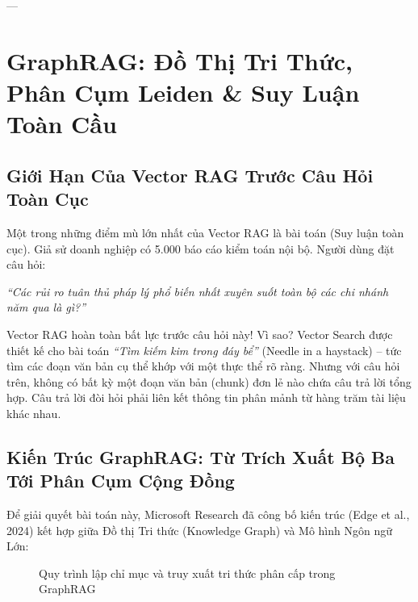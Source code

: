 ---

\section{GraphRAG: Đồ Thị Tri Thức, Phân Cụm Leiden \& Suy Luận Toàn Cầu}
\label{sec:graph-rag}

\subsection{Giới Hạn Của Vector RAG Trước Câu Hỏi Toàn Cục}
Một trong những điểm mù lớn nhất của Vector RAG là bài toán  (Suy luận toàn cục).
Giả sử doanh nghiệp có 5.000 báo cáo kiểm toán nội bộ. Người dùng đặt câu hỏi:
\begin{center}
\textit{``Các rủi ro tuân thủ pháp lý phổ biến nhất xuyên suốt toàn bộ các chi nhánh năm qua là gì?''}
\end{center}
Vector RAG hoàn toàn bất lực trước câu hỏi này! Vì sao?
Vector Search được thiết kế cho bài toán \textit{``Tìm kiếm kim trong đáy bể''} (Needle in a haystack) -- tức tìm các đoạn văn bản cụ thể khớp với một thực thể rõ ràng. Nhưng với câu hỏi trên, không có bất kỳ một đoạn văn bản (chunk) đơn lẻ nào chứa câu trả lời tổng hợp. Câu trả lời đòi hỏi phải liên kết thông tin phân mảnh từ hàng trăm tài liệu khác nhau.

\subsection{Kiến Trúc GraphRAG: Từ Trích Xuất Bộ Ba Tới Phân Cụm Cộng Đồng}
Để giải quyết bài toán này, Microsoft Research đã công bố kiến trúc  (Edge et al., 2024) kết hợp giữa Đồ thị Tri thức (Knowledge Graph) và Mô hình Ngôn ngữ Lớn:

\begin{figure}[htbp]
\centering
{}
\caption{Quy trình lập chỉ mục và truy xuất tri thức phân cấp trong GraphRAG}
\label{fig:graph-rag-pipeline}
\end{figure}


